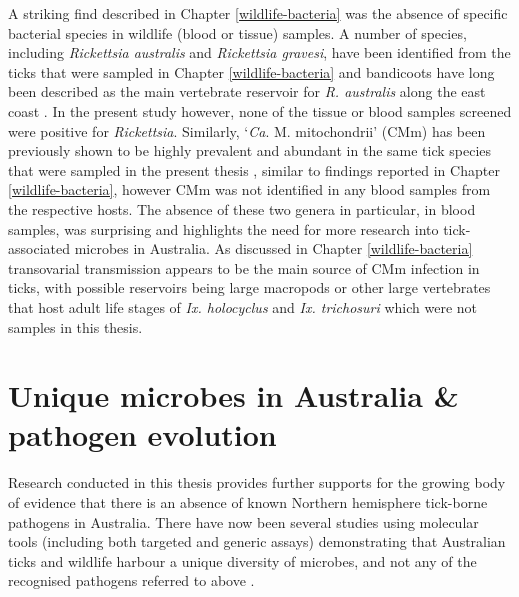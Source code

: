 \documentclass[a4paper, nobind]{templates/ociamthesis}
\begin{document}
A striking find described in Chapter \ref{wildlife-bacteria} was the absence of specific bacterial species in wildlife (blood or tissue) samples.
A number of species, including \emph{Rickettsia australis} and \emph{Rickettsia gravesi}, have been identified from the ticks that were sampled in Chapter \ref{wildlife-bacteria} and bandicoots have long been described as the main vertebrate reservoir for \emph{R. australis} along the east coast \autocite{campbellRickettsiosesAustraliaIsolation1974,sextonSpottedFeverGroup1991}.
In the present study however, none of the tissue or blood samples screened were positive for \emph{Rickettsia}.
Similarly, `\emph{Ca}. M. mitochondrii' (CMm) has been previously shown to be highly prevalent and abundant in the same tick species that were sampled in the present thesis \autocite{goftonInhibitionEndosymbiontCandidatus2015,eganBacterialCommunityProfiling2020}, similar to findings reported in Chapter \ref{wildlife-bacteria}, however CMm was not identified in any blood samples from the respective hosts.
The absence of these two genera in particular, in blood samples, was surprising and highlights the need for more research into tick-associated microbes in Australia.
As discussed in Chapter \ref{wildlife-bacteria} transovarial transmission appears to be the main source of CMm infection in ticks, with possible reservoirs being large macropods or other large vertebrates that host adult life stages of \emph{Ix. holocyclus} and \emph{Ix. trichosuri} which were not samples in this thesis.

\hypertarget{unique-microbes-in-australia-pathogen-evolution}{%
\section{Unique microbes in Australia \& pathogen evolution}\label{unique-microbes-in-australia-pathogen-evolution}}

Research conducted in this thesis provides further supports for the growing body of evidence that there is an absence of known Northern hemisphere tick-borne pathogens in Australia.
There have now been several studies using molecular tools (including both targeted and generic assays) demonstrating that Australian ticks and wildlife harbour a unique diversity of microbes, and not any of the recognised pathogens referred to above \autocite{goftonBacterialProfilingReveals2015,eganBacterialCommunityProfiling2020,hussain-yusufScreeningRickettsiaCoxiella2020}.
\end{document}
